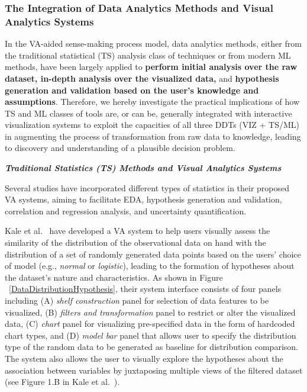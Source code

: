 \documentclass{sfuthesis}
\begin{document}
\subsubsection{The Integration of Data Analytics Methods and Visual Analytics Systems}
In the VA-aided sense-making process model, data analytics methods, either from the traditional statistical (TS) analysis class of techniques or from modern ML methods, have been largely applied to \textbf{perform initial analysis over the raw dataset, in-depth analysis over the visualized data,} and \textbf{hypothesis generation and validation based on the user’s knowledge and assumptions}. Therefore, we hereby investigate the practical implications of how TS and ML classes of tools are, or can be, generally integrated with interactive visualization systems to exploit the capacities of all three DDTs (VIZ + TS/ML) in augmenting the process of transformation from raw data to knowledge, leading to discovery and understanding of a plausible decision problem.\par
\noindent\textbf{\textit{Traditional Statistics (TS) Methods and Visual Analytics Systems}}\par
Several studies have incorporated different types of statistics in their proposed VA systems, aiming to facilitate EDA, hypothesis generation and validation, correlation and regression analysis, and uncertainty quantification.\par
Kale et al.~\cite{kale2023evm} have developed a VA system to help users visually assess the similarity of the distribution of the observational data on hand with the distribution of a set of randomly generated data points based on the users’ choice of model (e.g., \textit{normal} or \textit{logistic}), leading to the formation of hypotheses about the dataset’s nature and characteristics. As shown in Figure ~\ref{DataDistributionHypothesis}, their system interface consists of four panels including (A) \textit{shelf construction }panel for selection of data features to be visualized, (B) \textit{filters and transformation} panel to restrict or alter the visualized data, (C) \textit{chart} panel for visualizing pre-specified data in the form of hardcoded chart types, and (D) \textit{model bar} panel that allows user to specify the distribution type of the random data to be generated as baseline for distribution comparison. The system also allows the user to visually explore the hypotheses about the association between variables by juxtaposing multiple views of the filtered dataset (see Figure 1.B in Kale et al.~\cite{kale2023evm}).\par
\end{document}
